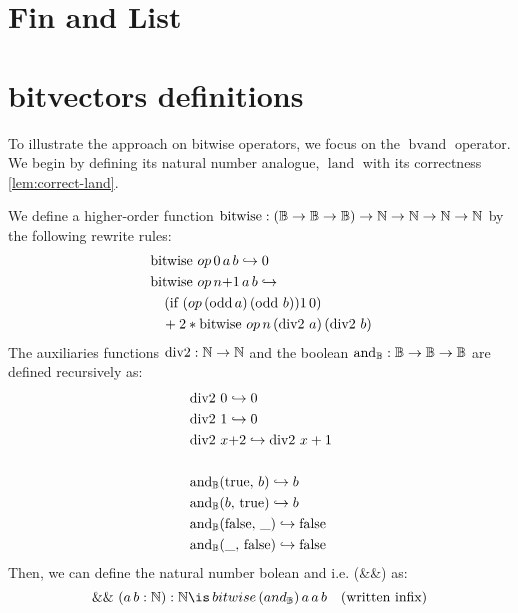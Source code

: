 \section{Fin and List}
\label{app:fin-and-list}

\section{bitvectors definitions}\label{app:bf-defs}

To illustrate the approach on bitwise operators, we focus on the $\mathop{bvand}$ operator.
We begin by defining its natural number analogue, $\mathop{land}$ with its correctness \cref{lem:correct-land}.

\begin{definition}
We define a higher-order function \( \mathop{\mathrm{bitwise}} : (\mathbb{B} \rightarrow \mathbb{B} \rightarrow \mathbb{B}) \rightarrow \mathbb{N} \rightarrow \mathbb{N} \rightarrow \mathbb{N} \rightarrow \mathbb{N} \) by the following rewrite rules:
\begin{align*}
&\mathop{\mathrm{bitwise}}\,op\, 0\, a\, b \hookrightarrow 0 \\
&\mathop{\mathrm{bitwise}}\,op\, n{+}1\, a\, b \hookrightarrow \\
&\quad\left( \text{if } (\mathop{op}\,(\mathop{\mathrm{odd}}a)\, (\mathop{\mathrm{odd}}\,b)) 1\,0 \right) \\
&\quad+ 2 * \mathop{\mathrm{bitwise}}\,op\, n\, (\mathop{\mathrm{div2}}\,a)\,(\mathop{\mathrm{div2}}\,b)
\end{align*}
The auxiliaries functions \( \mathop{\mathrm{div2}} : \mathbb{N} \rightarrow \mathbb{N} \) and the boolean \( \mathop{\mathrm{and}_{\mathbb{B}}} : \mathbb{B} \rightarrow \mathbb{B} \rightarrow \mathbb{B} \) are defined recursively as:
\begin{align*}
&\mathop{\mathrm{div2}}\,0 \hookrightarrow 0 \\
&\mathop{\mathrm{div2}}\,1 \hookrightarrow 0 \\
&\mathop{\mathrm{div2}}\,x{+}2 \hookrightarrow \mathop{\mathrm{div2}}\,x + 1 \\
&\\
&\mathop{\mathrm{and}_{\mathbb{B}}}(\mathrm{true},\, b) \hookrightarrow b \\
&\mathop{\mathrm{and}_{\mathbb{B}}}(b,\, \mathrm{true}) \hookrightarrow b \\
&\mathop{\mathrm{and}_{\mathbb{B}}}(\mathrm{false},\, \_) \hookrightarrow \mathrm{false} \\
&\mathop{\mathrm{and}_{\mathbb{B}}}(\_,\, \mathrm{false}) \hookrightarrow \mathrm{false}
\end{align*}
Then, we can define the natural number bolean and i.e. (\&\&) as:
\begin{equation*}
\&\&~(a\,b: \N): \N \is \mathop{bitwise}\,(and_\B)\,a\,a\,b \quad \text{(written infix)}
\end{equation*}
\end{definition}


